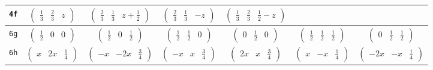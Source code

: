 \documentclass[fleqn,9pt,landscape]{jsarticle}
\begin{document}
\begin{center}
\begin{longtable}{ccccccc}
{\tt 4f} & $ \begin{pmatrix} \frac{1}{3} & \frac{2}{3} & z \end{pmatrix} $ & $ \begin{pmatrix} \frac{2}{3} & \frac{1}{3} & z + \frac{1}{2} \end{pmatrix} $ & $ \begin{pmatrix} \frac{2}{3} & \frac{1}{3} & - z \end{pmatrix} $ & $ \begin{pmatrix} \frac{1}{3} & \frac{2}{3} & \frac{1}{2} - z \end{pmatrix} $ & $  $ & $  $ \\ \hline
{\tt 6g} & $ \begin{pmatrix} \frac{1}{2} & 0 & 0 \end{pmatrix} $ & $ \begin{pmatrix} \frac{1}{2} & 0 & \frac{1}{2} \end{pmatrix} $ & $ \begin{pmatrix} \frac{1}{2} & \frac{1}{2} & 0 \end{pmatrix} $ & $ \begin{pmatrix} 0 & \frac{1}{2} & 0 \end{pmatrix} $ & $ \begin{pmatrix} \frac{1}{2} & \frac{1}{2} & \frac{1}{2} \end{pmatrix} $ & $ \begin{pmatrix} 0 & \frac{1}{2} & \frac{1}{2} \end{pmatrix} $ \\ \hline
{\tt 6h} & $ \begin{pmatrix} x & 2 x & \frac{1}{4} \end{pmatrix} $ & $ \begin{pmatrix} - x & - 2 x & \frac{3}{4} \end{pmatrix} $ & $ \begin{pmatrix} - x & x & \frac{3}{4} \end{pmatrix} $ & $ \begin{pmatrix} 2 x & x & \frac{3}{4} \end{pmatrix} $ & $ \begin{pmatrix} x & - x & \frac{1}{4} \end{pmatrix} $ & $ \begin{pmatrix} - 2 x & - x & \frac{1}{4} \end{pmatrix} $ \\ \hline

\end{longtable}
\end{center}
\end{document}
